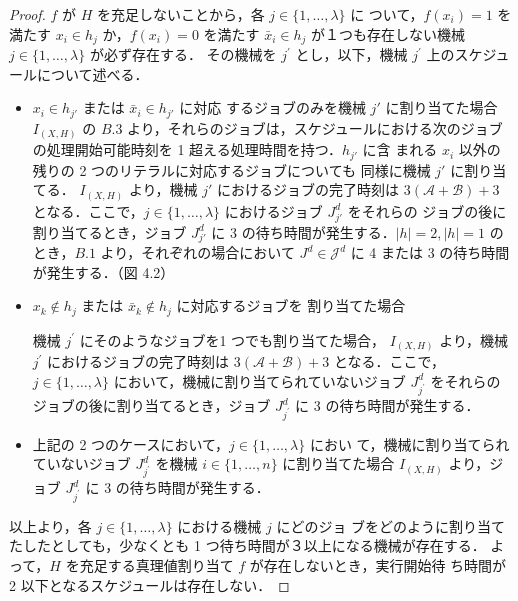 \documentclass[12pt]{optlab-bachelor}
\begin{document}
\begin{proof}
  $f$ が $H$ を充足しないことから，各 $j \in \{1, \ldots, \lambda \}$ に
  ついて，$f(x_i) = 1$ を満たす $x_i \in h_j$ か，$f(x_i) = 0$ を満たす
  $\bar x_i \in h_j$ が１つも存在しない機械 $j \in \{1,\ldots, \lambda\}$ が必ず存在する．
  その機械を $j^{\prime}$ とし，以下，機械 $j^{\prime}$ 上のスケジュールについて述べる．
  \begin{itemize}
    \item $x_i \in h_{j'}$ または $\bar x_i \in h_{j'}$ に対応
    するジョブのみを機械 $j'$ に割り当てた場合
    $I_{(X,H)}$ の $B.3$ より，それらのジョブは，スケジュールにおける次のジョブの処理開始可能時刻を 1 超える処理時間を持つ．$h_{j'}$ に含
    まれる $x_i$ 以外の残りの 2 つのリテラルに対応するジョブについても
    同様に機械 $j'$ に割り当てる．
    $I_{(X,H)}$ より，機械 $j'$ におけるジョブの完了時刻は
    $3(\mathcal{A} + \mathcal{B}) + 3$ となる．ここで，$j \in
    \{1,\ldots,\lambda\}$ におけるジョブ $J^d_{j'}$ をそれらの
    ジョブの後に割り当てるとき，ジョブ $J^d_{j'}$ に 3 の待ち時間が発生する．$|h| = 2,|h| = 1$ のとき，$B.1$ より，それぞれの場合において $J^d \in \mathcal{J}^d$ に 4 または 3 の待ち時間が発生する．（図 4.2）
  \end{itemize}

  \begin{itemize}
    \item $x_k \notin h_j$ または $\bar x_k \notin h_j$ に対応するジョブを
    割り当てた場合

    機械 $j^{\prime}$ にそのようなジョブを1 つでも割り当てた場合，
    $I_{(X,H)}$ より，機械 $j^{\prime}$ におけるジョブの完了時刻は
    $3(\mathcal{A} + \mathcal{B}) + 3$ となる．ここで，$j \in
    \{1,\ldots,\lambda\}$ において，機械に割り当てられていないジョブ
    $J^d_{j^{\prime}}$ をそれらのジョブの後に割り当てるとき，ジョブ
    $J^d_{j^{\prime}}$ に 3 の待ち時間が発生する．
    \item 上記の 2 つのケースにおいて，$j \in \{1,\ldots,\lambda\}$ におい
    て，機械に割り当てられていないジョブ $J^d_{j^{\prime}}$ を機械 $i
    \in \{1,\ldots,n\}$ に割り当てた場合 $I_{(X,H)}$ より，ジョブ
    $J^d_{j^{\prime}}$ に 3 の待ち時間が発生する．
  \end{itemize}
  以上より，各 $j \in \{1,\ldots,\lambda\}$ における機械 $j$ にどのジョ
  ブをどのように割り当てたしたとしても，少なくとも 1 つ待ち時間が３以上になる機械が存在する．
  よって，$H$ を充足する真理値割り当て $f$ が存在しないとき，実行開始待
  ち時間が 2 以下となるスケジュールは存在しない．
\end{proof}
\end{document}
